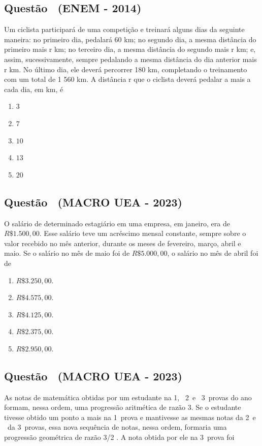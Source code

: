 \documentclass[12pt]{article}
\newcounter{questao}
\newcommand{\novaquestao}[1]{%
  \stepcounter{questao}%
  \subsection*{Questão \thequestao\ (#1)}%
}
\begin{document}
\begin{multicols}{2}
        \novaquestao{ENEM - 2014}
        
            Um ciclista participará de uma competição e treinará alguns dias da seguinte maneira: no primeiro dia, pedalará 60 km; no segundo dia, a mesma distância do primeiro mais r km; no terceiro dia, a mesma distância do segundo mais r km; e, assim, sucessivamente, sempre pedalando a mesma distância do dia anterior mais r km. No último dia, ele deverá percorrer 180 km, completando o treinamento com um total de 1 560 km. A distância r que o ciclista deverá pedalar a mais a cada dia, em km, é

            \begin{enumerate}[label=(\alph*), noitemsep]
                \item $3$
                \item $7$
                \item $10$
                \item $13$
                \item $20$
            \end{enumerate}
        
        \novaquestao{MACRO UEA - 2023}
            O salário de determinado estagiário em uma empresa, em janeiro, era de $R\$ 1.500,00$. Esse salário teve um acréscimo mensal constante, sempre sobre o valor recebido no mês anterior, durante os meses de fevereiro, março, abril e maio. Se o salário no mês de maio foi de $R\$ 5.000,00$, o salário no mês de abril foi de

            \begin{enumerate}[label=(\alph*), noitemsep]
                \item $R\$ 3.250,00.$
                \item $R\$ 4.575,00.$
                \item $R\$ 4.125,00.$
                \item $R\$ 2.375,00.$               
                \item $R\$ 2.950,00.$

            \end{enumerate}
        
        \novaquestao{MACRO UEA - 2023}
            As notas de matemática obtidas por um estudante na 1\textordfeminine, \ 2\textordfeminine \ e \ 3\textordfeminine \ provas do ano formam, nessa ordem, uma progressão aritmética de razão 3. Se o estudante tivesse obtido um ponto a mais na 1\textordfeminine \ prova e mantivesse as mesmas notas da 2\textordfeminine \  e \ da 3\textordfeminine \ provas, essa nova sequência de notas, nessa ordem, formaria uma progressão geométrica de razão 3/2 . A nota obtida por ele na 3\textordfeminine \  prova foi


\end{multicols}
\end{document}

